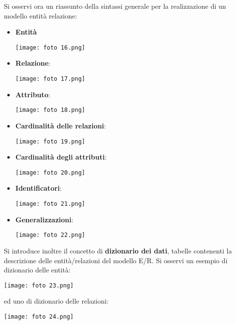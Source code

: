 \documentclass{article}
\begin{document}
Si osservi ora un riassunto della sintassi generale per la realizzazione di un modello entità relazione:
\begin{itemize}[label={-}, leftmargin=1cm]
    \item \textbf{Entità}
    \begin{center}
        \texttt{[image: foto 16.png]}
    \end{center}
    \item \textbf{Relazione}:
    \begin{center}
        \texttt{[image: foto 17.png]}
    \end{center}
    \item \textbf{Attributo}:
    \begin{center}
        \texttt{[image: foto 18.png]}
    \end{center}
    \item \textbf{Cardinalità delle relazioni}:
    \begin{center}
        \texttt{[image: foto 19.png]}
    \end{center}
    \item \textbf{Cardinalità degli attributi}:
    \begin{center}
        \texttt{[image: foto 20.png]}
    \end{center}
    \item \textbf{Identificatori}:
    \begin{center}
        \texttt{[image: foto 21.png]}
    \end{center}
    \item \textbf{Generalizzazioni}:
    \begin{center}
        \texttt{[image: foto 22.png]}\vspace{50pt}\\
    \end{center}
\end{itemize}
Si introduce inoltre il concetto di \textbf{dizionario dei dati}, tabelle contenenti la descrizione delle entità/relazioni del modello E/R. Si osservi un esempio di dizionario delle entità:
\begin{center}
    \texttt{[image: foto 23.png]}
\end{center}
ed uno di dizionario delle relazioni:
\begin{center}
    \texttt{[image: foto 24.png]}\vspace{14pt}\\
\end{center}
\end{document}
